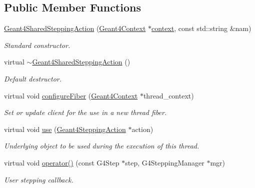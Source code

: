 \subsection*{Public Member Functions}
\begin{DoxyCompactItemize}
\item 
\hyperlink{class_d_d4hep_1_1_simulation_1_1_geant4_shared_stepping_action_a097ab882bbad9d3a4c4dae2e7f764631}{Geant4\+Shared\+Stepping\+Action} (\hyperlink{class_d_d4hep_1_1_simulation_1_1_geant4_context}{Geant4\+Context} $\ast$\hyperlink{class_d_d4hep_1_1_simulation_1_1_geant4_action_aa9d87f0ec2a72b7fc2591b18f98d75cf}{context}, const std\+::string \&nam)
\begin{DoxyCompactList}\small\item\em Standard constructor. \end{DoxyCompactList}\item 
virtual \hyperlink{class_d_d4hep_1_1_simulation_1_1_geant4_shared_stepping_action_a3a2b73cd49e3441d740456240d5125ab}{$\sim$\+Geant4\+Shared\+Stepping\+Action} ()
\begin{DoxyCompactList}\small\item\em Default destructor. \end{DoxyCompactList}\item 
virtual void \hyperlink{class_d_d4hep_1_1_simulation_1_1_geant4_shared_stepping_action_ae023874861eb3048eba53ef6cd253224}{configure\+Fiber} (\hyperlink{class_d_d4hep_1_1_simulation_1_1_geant4_context}{Geant4\+Context} $\ast$thread\+\_\+context)
\begin{DoxyCompactList}\small\item\em Set or update client for the use in a new thread fiber. \end{DoxyCompactList}\item 
virtual void \hyperlink{class_d_d4hep_1_1_simulation_1_1_geant4_shared_stepping_action_a2c04725bc0820515ab86fde2ead70829}{use} (\hyperlink{class_d_d4hep_1_1_simulation_1_1_geant4_stepping_action}{Geant4\+Stepping\+Action} $\ast$action)
\begin{DoxyCompactList}\small\item\em Underlying object to be used during the execution of this thread. \end{DoxyCompactList}\item 
virtual void \hyperlink{class_d_d4hep_1_1_simulation_1_1_geant4_shared_stepping_action_a5128c3fa4f478cda734a35a09ee86ae0}{operator()} (const G4\+Step $\ast$step, G4\+Stepping\+Manager $\ast$mgr)
\begin{DoxyCompactList}\small\item\em User stepping callback. \end{DoxyCompactList}\end{DoxyCompactItemize}
